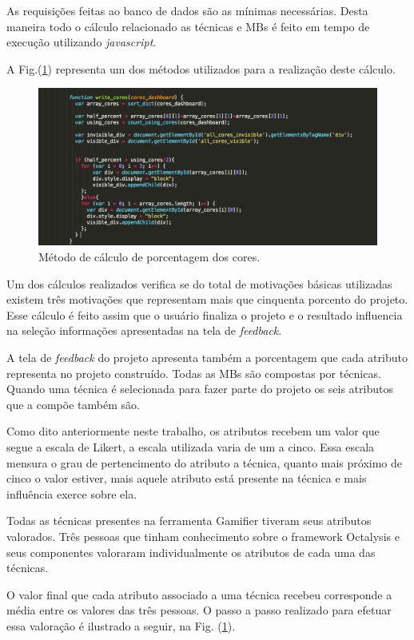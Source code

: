 As requisições feitas ao banco de dados são as mínimas necessárias. Desta maneira todo o cálculo relacionado as técnicas e MBs é feito em tempo de execução utilizando \textit{javascript}. 

A  Fig.(\ref{fig12}) representa um dos métodos utilizados para a realização deste cálculo.\newpage

\begin{figure}[h]
	\centering
		\includegraphics[keepaspectratio=true,scale=0.6]{figuras/cores.png}
	\caption{Método de cálculo de porcentagem dos cores.\label{fig12}}
\end{figure}

Um dos cálculos realizados verifica se do total de motivações básicas utilizadas existem três motivações que representam mais que cinquenta porcento do projeto. Esse cálculo é feito assim que o usuário finaliza o projeto e o resultado influencia na seleção informações apresentadas na tela de \textit{feedback}. 

A tela de \textit{feedback} do projeto apresenta também a porcentagem que cada atributo representa no projeto construído. Todas as MBs são compostas por técnicas. Quando  uma técnica é selecionada para fazer parte do projeto os seis atributos que a compõe também são. 

Como dito anteriormente neste trabalho, os atributos recebem um valor que segue a escala de Likert, a escala utilizada varia de um a cinco.  Essa escala mensura o grau de pertencimento do atributo a técnica, quanto mais próximo de cinco o valor estiver, mais aquele atributo está presente na técnica e mais influência exerce sobre ela. 

Todas as técnicas presentes na ferramenta Gamifier tiveram seus atributos valorados. Três pessoas que tinham conhecimento sobre o framework Octalysis e seus componentes valoraram individualmente os atributos de cada uma das técnicas.

 O valor final que cada atributo associado a uma técnica recebeu corresponde a média entre os valores das três pessoas. O passo a passo realizado para efetuar essa valoração é ilustrado a seguir, na Fig. (\ref{fig12}).\newpage


